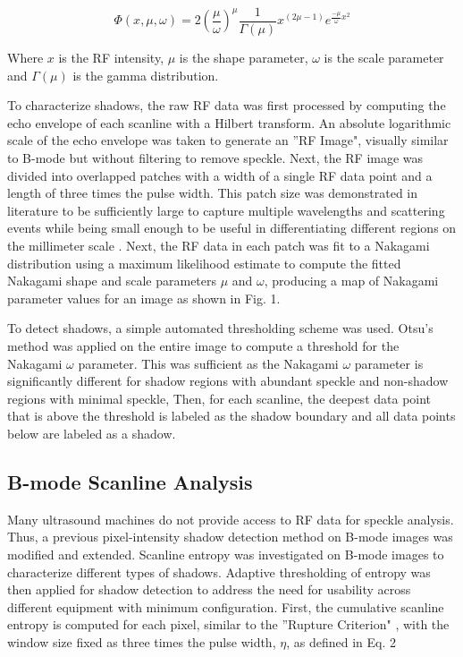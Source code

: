 \documentclass[preprint,5p,authoryear]{elsarticle}
\begin{document}
\begin{equation}
\Phi(x,\mu,\omega) = 2(\frac{\mu}{\omega})^{\mu}\frac{1}{\Gamma(\mu)}x^{(2\mu-1)}e^{\frac{-\mu}{\omega}x^{2}}
\end{equation}

Where $x$ is the RF intensity, $\mu$ is the shape parameter, $\omega$ is the scale parameter and $\Gamma(\mu)$ is the gamma distribution.

To characterize shadows, the raw RF data was first processed by computing the echo envelope of each scanline with a Hilbert transform. An absolute logarithmic scale of the echo envelope was taken to generate an ''RF Image", visually similar to B-mode but without filtering to remove speckle. Next, the RF image was divided into overlapped patches with a width of a single RF data point and a length of three times the pulse width. This patch size was demonstrated in literature to be sufficiently large to capture multiple wavelengths and scattering events while being small enough to be useful in differentiating different regions on the millimeter scale \citep{Byra2016}. Next, the RF data in each patch was fit to a Nakagami distribution using a maximum likelihood estimate to compute the fitted Nakagami shape and scale parameters $\mu$ and $\omega$, producing a map of Nakagami parameter values for an image as shown in Fig. 1.

To detect shadows, a simple automated thresholding scheme was used. Otsu's method was applied on the entire image to compute a threshold for the Nakagami $\omega$ parameter. This was sufficient as the Nakagami $\omega$ parameter is significantly different for shadow regions with abundant speckle and non-shadow regions with minimal speckle, Then, for each scanline, the deepest data point that is above the threshold is labeled as the shadow boundary and all data points below are labeled as a shadow.

\subsection*{B-mode Scanline Analysis}

Many ultrasound machines do not provide access to RF data for speckle analysis. Thus, a previous pixel-intensity shadow detection method on B-mode images was modified and extended. Scanline entropy was investigated on B-mode images to characterize different types of shadows. Adaptive thresholding of entropy was then applied for shadow detection to address the need for usability across different equipment with minimum configuration. First, the cumulative scanline entropy is computed for each pixel, similar to the ''Rupture Criterion" \citep{Hellier2010}, with the window size fixed as three times the pulse width, $\eta$, as defined in Eq. 2
\end{document}
